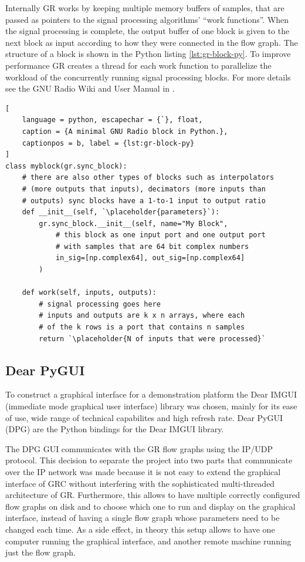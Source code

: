 Internally GR works by keeping multiple memory buffers of samples, that are passed as pointers to the signal processing algorithms' ``work functions''. When the signal processing is complete, the output buffer of one block is given to the next block as input according to how they were connected in the flow graph. The structure of a block is shown in the Python listing \ref{lst:gr-block-py}. To improve performance GR creates a thread for each work function to parallelize the workload of the concurrently running signal processing blocks. For more details see the GNU Radio Wiki and User Manual in \cite{GRWiki}.

{\newcommand{\placeholder}[1]{\textit{\(\langle\)\,\textrm{#1}\,\(\rangle\)}}
\begin{lstlisting}[
	language = python, escapechar = {`}, float,
	caption = {A minimal GNU Radio block in Python.},
	captionpos = b, label = {lst:gr-block-py}
]
class myblock(gr.sync_block):
	# there are also other types of blocks such as interpolators 
	# (more outputs that inputs), decimators (more inputs than 
	# outputs) sync blocks have a 1-to-1 input to output ratio
	def __init__(self, `\placeholder{parameters}`):
		gr.sync_block.__init__(self, name="My Block",
			# this block as one input port and one output port
			# with samples that are 64 bit complex numbers
			in_sig=[np.complex64], out_sig=[np.complex64]
		)

	def work(self, inputs, outputs):
		# signal processing goes here
		# inputs and outputs are k x n arrays, where each
		# of the k rows is a port that contains n samples
		return `\placeholder{N of inputs that were processed}`
\end{lstlisting}}

\subsection{Dear PyGUI}\label{sec:GUI}

To construct a graphical interface for a demonstration platform the Dear IMGUI (immediate mode graphical user interface) library was chosen, mainly for its ease of use, wide range of technical capabilites and high refresh rate. Dear PyGUI (DPG) are the Python bindings for the Dear IMGUI library.

The DPG GUI communicates with the GR flow graphs using the IP/UDP protocol. This decision to separate the project into two parts that communicate over the IP network was made because it is not easy to extend the graphical interface of GRC without interfering with the sophisticated multi-threaded architecture of GR. Furthermore, this allows to have multiple correctly configured flow graphs on disk and to choose which one to run and display on the graphical interface, instead of having a single flow graph whose parameters need to be changed each time. As a side effect, in theory this setup allows to have one computer running the graphical interface, and another remote machine running just the flow graph.

